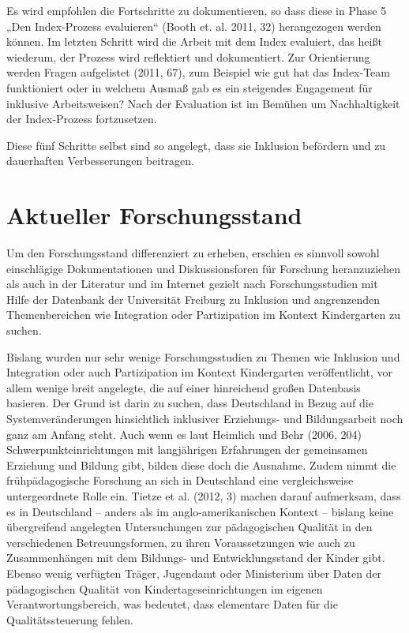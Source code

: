 Es wird empfohlen die Fortschritte zu dokumentieren, so dass diese in Phase 5 „Den Index-Prozess evaluieren“ (Booth et. al. 2011, 32) herangezogen werden können. Im letzten Schritt wird die Arbeit mit dem Index evaluiert, das heißt wiederum, der Prozess wird reflektiert und dokumentiert. Zur Orientierung werden Fragen aufgelistet (2011, 67), zum Beispiel wie gut hat das Index-Team funktioniert oder in welchem Ausmaß gab es ein steigendes Engagement für inklusive Arbeitsweisen? Nach der Evaluation ist im Bemühen um Nachhaltigkeit der Index-Prozess fortzusetzen. 
  
Diese fünf Schritte selbst sind so angelegt, dass sie Inklusion befördern und zu dauerhaften Verbesserungen beitragen.

\chapter{Aktueller Forschungsstand}\label{Forschung}
Um den Forschungsstand differenziert zu erheben, erschien es sinnvoll sowohl einschlägige Dokumentationen und Diskussionsforen für Forschung heranzuziehen als auch in der Literatur und im Internet gezielt nach Forschungsstudien mit Hilfe der Datenbank der Universität Freiburg zu Inklusion und angrenzenden Themenbereichen wie Integration oder Partizipation im Kontext Kindergarten zu suchen.

Bislang wurden nur sehr wenige Forschungsstudien zu Themen wie Inklusion und Integration oder auch Partizipation im Kontext Kindergarten veröffentlicht, vor allem wenige breit angelegte, die auf einer hinreichend großen Datenbasis basieren. Der Grund ist darin zu suchen, dass Deutschland in Bezug auf die Systemveränderungen hinsichtlich inklusiver Erziehungs- und Bildungsarbeit noch ganz am Anfang steht. Auch wenn es laut Heimlich und Behr (2006, 204) Schwerpunkteinrichtungen mit langjährigen Erfahrungen der gemeinsamen Erziehung und Bildung gibt, bilden diese doch die Ausnahme.  
Zudem nimmt die frühpädagogische Forschung an sich in Deutschland eine vergleichsweise untergeordnete Rolle ein. 
Tietze et al. (2012, 3) machen darauf aufmerksam, dass es in Deutschland – anders als im anglo-amerikanischen Kontext – bislang keine übergreifend angelegten Untersuchungen zur pädagogischen Qualität in den verschiedenen Betreuungsformen, zu ihren Voraussetzungen wie auch zu Zusammenhängen mit dem Bildungs- und Entwicklungsstand der Kinder gibt. Ebenso wenig verfügten Träger, Jugendamt oder Ministerium über Daten der pädagogischen Qualität von Kindertageseinrichtungen im eigenen Verantwortungsbereich, was bedeutet, dass elementare Daten für die Qualitätssteuerung fehlen.

